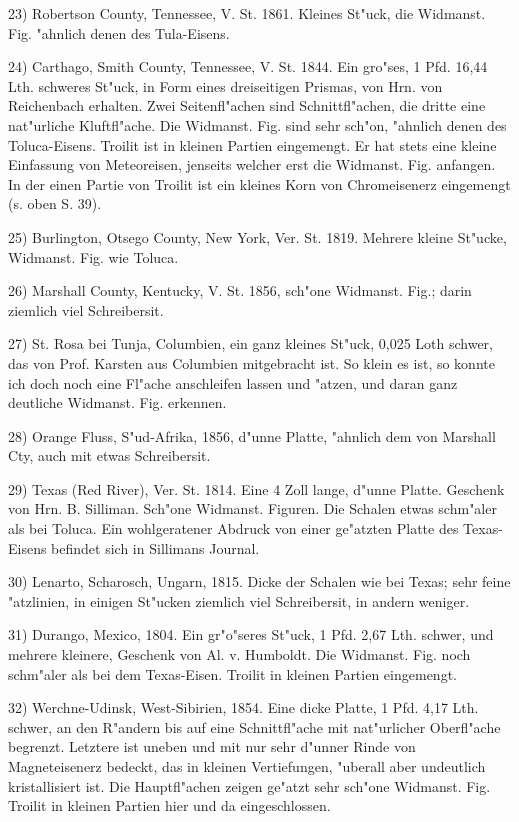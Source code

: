 \documentclass[a4paper, 11pt, oneside]{article}
\begin{document}
23) Robertson County, Tennessee, V. St. 1861. Kleines St"uck, die Widmanst. Fig. "ahnlich denen des Tula-Eisens.

24) Carthago, Smith County, Tennessee, V. St. 1844. Ein gro"ses, 1 Pfd. 16,44 Lth. schweres St"uck, in Form eines dreiseitigen Prismas, von Hrn. von Reichenbach erhalten. Zwei Seitenfl"achen sind Schnittfl"achen, die dritte eine nat"urliche Kluftfl"ache. Die Widmanst. Fig. sind sehr sch"on, "ahnlich denen des Toluca-Eisens. Troilit ist in kleinen Partien eingemengt. Er hat stets eine kleine Einfassung von Meteoreisen, jenseits welcher erst die Widmanst. Fig. anfangen. In der einen Partie von Troilit ist ein kleines Korn von Chromeisenerz eingemengt (s. oben S. 39).

25) Burlington, Otsego County, New York, Ver. St. 1819. Mehrere kleine St"ucke, Widmanst. Fig. wie Toluca.

26) Marshall County, Kentucky, V. St. 1856, sch"one Widmanst. Fig.; darin ziemlich viel Schreibersit.

27) St. Rosa bei Tunja, Columbien, ein ganz kleines St"uck, 0,025 Loth schwer, das von Prof. Karsten aus Columbien mitgebracht ist. So klein es ist, so konnte ich doch noch eine Fl"ache anschleifen lassen und "atzen, und daran ganz deutliche Widmanst. Fig. erkennen.

28) Orange Fluss, S"ud-Afrika, 1856, d"unne Platte, "ahnlich dem von Marshall Cty, auch mit etwas Schreibersit.

29) Texas (Red River), Ver. St. 1814. Eine 4 Zoll lange, d"unne Platte. Geschenk von Hrn. B. Silliman. Sch"one Widmanst. Figuren. Die Schalen etwas schm"aler als bei Toluca. Ein wohlgeratener Abdruck von einer ge"atzten Platte des Texas-Eisens befindet sich in Sillimans Journal.

30) Lenarto, Scharosch, Ungarn, 1815. Dicke der Schalen wie bei Texas; sehr feine "atzlinien, in einigen St"ucken ziemlich viel Schreibersit, in andern weniger.

31) Durango, Mexico, 1804. Ein gr"o"seres St"uck, 1 Pfd. 2,67 Lth. schwer, und mehrere kleinere, Geschenk von Al. v. Humboldt. Die Widmanst. Fig. noch schm"aler als bei dem Texas-Eisen. Troilit in kleinen Partien eingemengt.

32) Werchne-Udinsk, West-Sibirien, 1854. Eine dicke Platte, 1 Pfd. 4,17 Lth. schwer, an den R"andern bis auf eine Schnittfl"ache mit nat"urlicher Oberfl"ache begrenzt. Letztere ist uneben und mit nur sehr d"unner Rinde von Magneteisenerz bedeckt, das in kleinen Vertiefungen, "uberall aber undeutlich kristallisiert ist. Die Hauptfl"achen zeigen ge"atzt sehr sch"one Widmanst. Fig. Troilit in kleinen Partien hier und da eingeschlossen.
\end{document}
